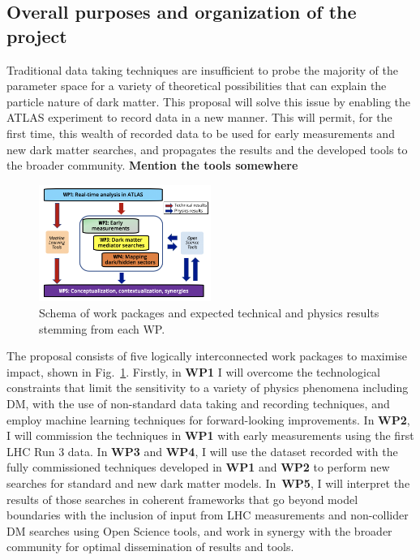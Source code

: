 \documentclass[11pt,a4paper]{article}
\begin{document}
\subsection{Overall purposes and organization of the project} 

Traditional data taking techniques are insufficient to probe the majority of the parameter space for a variety of theoretical possibilities that can explain the particle nature of dark matter. This proposal will solve this issue by enabling the ATLAS experiment to record data in a new manner. This will permit, for the first time, this wealth of recorded data to be used for early measurements and new dark matter searches, and propagates the results and the developed tools to the broader community. \textbf{Mention the tools somewhere}

\begin{figure} 
\begin{center}
\includegraphics[width=0.5\textwidth]{figs/WPs}
\caption{\label{fig:WPs} \small Schema of work packages and expected technical and physics results stemming from each WP.}
\end{center}
\end{figure}

The proposal consists of five logically interconnected work packages to maximise impact, shown in Fig.~\ref{fig:WPs}. Firstly, in \textbf{WP1} I will overcome the technological constraints that limit the sensitivity to a variety of physics phenomena including DM, with the use of non-standard data taking and recording techniques, and employ machine learning techniques for forward-looking improvements. In \textbf{WP2}, I will commission the techniques in \textbf{WP1} with early measurements using the first LHC Run 3 data. In \textbf{WP3} and \textbf{WP4}, I will use the dataset recorded with the fully commissioned techniques developed in \textbf{WP1} and \textbf{WP2} to perform new searches for standard and new dark matter models. In~\textbf{WP5}, I will interpret the results of those searches in coherent frameworks that go beyond model boundaries with the inclusion of input from LHC measurements and non-collider DM searches using Open Science tools, and work in synergy with the broader community for optimal dissemination of results and tools. 
\medskip
\end{document}
